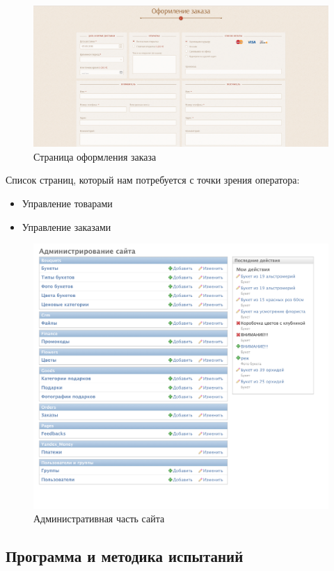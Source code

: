 \begin{figure}[H]
	\centering
	\caption{Страница оформления заказа}
	\includegraphics[width=.9\textwidth]{img/4.png}
\end{figure}


Список страниц, который нам потребуется с точки зрения оператора:

\begin{itemize}
	\item Управление товарами
	\item Управление заказами
\end{itemize}

\begin{figure}[H]
	\centering
	\caption{Административная часть сайта}
	\includegraphics[width=.9\textwidth]{img/5.png}
\end{figure}


\subsection{Программа и методика испытаний}

